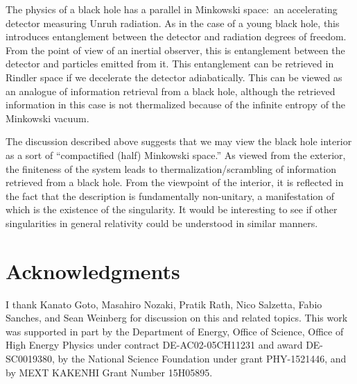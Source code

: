\documentclass[12pt]{article}
\begin{document}
The physics of a black hole has a parallel in Minkowski space:\ 
an accelerating detector measuring Unruh radiation.  As in the case 
of a young black hole, this introduces entanglement between the 
detector and radiation degrees of freedom.  From the point of view 
of an inertial observer, this is entanglement between the detector 
and particles emitted from it.  This entanglement can be retrieved 
in Rindler space if we decelerate the detector adiabatically. 
This can be viewed as an analogue of information retrieval from 
a black hole, although the retrieved information in this case 
is not thermalized because of the infinite entropy of the 
Minkowski vacuum.

The discussion described above suggests that we may view the black 
hole interior as a sort of ``compactified (half) Minkowski space.'' 
As viewed from the exterior, the finiteness of the system leads 
to thermalization/scrambling of information retrieved from a black 
hole.  From the viewpoint of the interior, it is reflected in 
the fact that the description is fundamentally non-unitary, a 
manifestation of which is the existence of the singularity.  It 
would be interesting to see if other singularities in general 
relativity could be understood in similar manners.


\section*{Acknowledgments}

I thank Kanato Goto, Masahiro Nozaki, Pratik Rath, Nico Salzetta, 
Fabio Sanches, and Sean Weinberg for discussion on this and related 
topics.  This work was supported in part by the Department of Energy, 
Office of Science, Office of High Energy Physics under contract 
DE-AC02-05CH11231 and award DE-SC0019380, by the National Science 
Foundation under grant PHY-1521446, and by MEXT KAKENHI Grant 
Number 15H05895.
\end{document}

